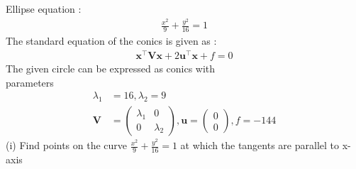 \documentclass[10pt, a4paper]{article}
\newcommand{\myvec}[1]{\ensuremath{\begin{pmatrix}#1\end{pmatrix}}}
\let\vec\mathbf
\begin{document}
Ellipse equation : \begin{align}
\frac{x^2}{9}+\frac{y^2}{16}=1
  \end{align}
The standard equation of the conics is given as :
\begin{align}
\vec{x}^{\top}\vec{V}\vec{x}+2\vec{u}^{\top}\vec{x}+f=0
\end{align}
The given circle  can be expressed as conics with \\parameters
\begin{align}
	\lambda_1&=16,\lambda_2=9 \\ \vec{V} &= \myvec{	\lambda_1& 0 \\
			          0 & \lambda_2}  
		    , \vec{u} = \myvec{0 \\0}, f = -144
	\end{align}
	(i) Find points on the curve $\frac{x^2}{9}+\frac{y^2}{16}=1$ at which the tangents are parallel to x-axis\\
	
\end{document}
